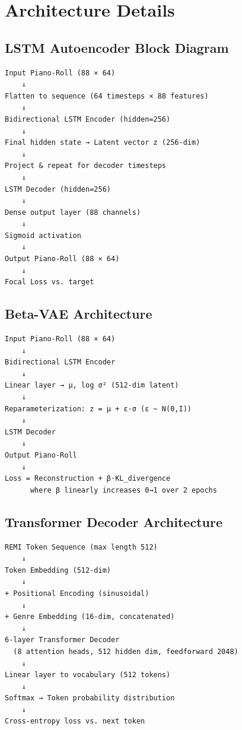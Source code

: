 \appendix

\section{Architecture Details}

\subsection{LSTM Autoencoder Block Diagram}
\begin{verbatim}
Input Piano-Roll (88 × 64)
    ↓
Flatten to sequence (64 timesteps × 88 features)
    ↓
Bidirectional LSTM Encoder (hidden=256)
    ↓
Final hidden state → Latent vector z (256-dim)
    ↓
Project & repeat for decoder timesteps
    ↓
LSTM Decoder (hidden=256)
    ↓
Dense output layer (88 channels)
    ↓
Sigmoid activation
    ↓
Output Piano-Roll (88 × 64)
    ↓
Focal Loss vs. target
\end{verbatim}

\subsection{Beta-VAE Architecture}
\begin{verbatim}
Input Piano-Roll (88 × 64)
    ↓
Bidirectional LSTM Encoder
    ↓
Linear layer → μ, log σ² (512-dim latent)
    ↓
Reparameterization: z = μ + ε·σ (ε ~ N(0,I))
    ↓
LSTM Decoder
    ↓
Output Piano-Roll
    ↓
Loss = Reconstruction + β·KL_divergence
      where β linearly increases 0→1 over 2 epochs
\end{verbatim}

\subsection{Transformer Decoder Architecture}
\begin{verbatim}
REMI Token Sequence (max length 512)
    ↓
Token Embedding (512-dim)
    ↓
+ Positional Encoding (sinusoidal)
    ↓
+ Genre Embedding (16-dim, concatenated)
    ↓
6-layer Transformer Decoder
  (8 attention heads, 512 hidden dim, feedforward 2048)
    ↓
Linear layer to vocabulary (512 tokens)
    ↓
Softmax → Token probability distribution
    ↓
Cross-entropy loss vs. next token
\end{verbatim}

